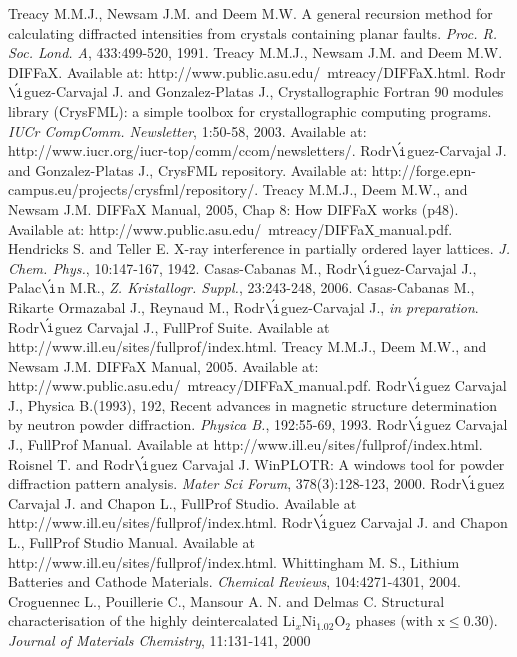 

\begin{thebibliography}{99}
 Treacy M.M.J., Newsam J.M. and Deem M.W. A general recursion method for calculating diffracted intensities from crystals containing planar faults. \textit{Proc. R. Soc. Lond. A}, 433:499-520, 1991. 
 Treacy M.M.J., Newsam J.M. and Deem M.W. DIFFaX. Available at: http://www.public.asu.edu/~mtreacy/DIFFaX.html.
 Rodr$\acute{\i}$guez-Carvajal J. and Gonzalez-Platas J., Crystallographic Fortran 90 modules library (CrysFML): a simple toolbox for crystallographic computing programs. \textit{IUCr CompComm. Newsletter}, 1:50-58, 2003. Available at: http://www.iucr.org/iucr-top/comm/ccom/newsletters/. 
 Rodr$\acute{\i}$guez-Carvajal J. and Gonzalez-Platas J., CrysFML repository. Available at: http://forge.epn-campus.eu/projects/crysfml/repository/.
 Treacy M.M.J., Deem M.W., and Newsam J.M. DIFFaX Manual, 2005, Chap 8: How DIFFaX works (p48). Available at: http://www.public.asu.edu/~mtreacy/DIFFaX$\_$manual.pdf.
 Hendricks S. and Teller E. X-ray interference in partially ordered layer lattices. \textit{J. Chem. Phys.}, 10:147-167, 1942.
 Casas-Cabanas M., Rodr$\acute{\i}$guez-Carvajal J., Palac$\acute{\i}$n M.R., \textit{Z. Kristallogr. Suppl.}, 23:243-248, 2006.
 Casas-Cabanas M., Rikarte Ormazabal J., Reynaud M., Rodr$\acute{\i}$guez-Carvajal J., \textit{in preparation}.
 Rodr$\acute{\i}$guez Carvajal J., FullProf Suite. Available at http://www.ill.eu/sites/fullprof/index.html.
 Treacy M.M.J., Deem M.W., and Newsam J.M. DIFFaX Manual, 2005. Available at: http://www.public.asu.edu/~mtreacy/DIFFaX$\_$manual.pdf.
 Rodr$\acute{\i}$guez Carvajal J., Physica B.(1993), 192, Recent advances in magnetic structure determination by neutron powder 
diffraction. \textit{Physica B.}, 192:55-69, 1993.
 Rodr$\acute{\i}$guez Carvajal J., FullProf Manual. Available at http://www.ill.eu/sites/fullprof/index.html.
 Roisnel T. and Rodr$\acute{\i}$guez Carvajal J. WinPLOTR: A windows tool for powder diffraction pattern analysis. \textit{Mater Sci Forum}, 378(3):128-123, 2000.
 Rodr$\acute{\i}$guez Carvajal J. and Chapon L., FullProf Studio. Available at http://www.ill.eu/sites/fullprof/index.html.
 Rodr$\acute{\i}$guez Carvajal J. and Chapon L., FullProf Studio Manual. Available at http://www.ill.eu/sites/fullprof/index.html.
 Whittingham M. S., Lithium Batteries and Cathode Materials. \textit{Chemical Reviews}, 104:4271-4301, 2004. 
 Croguennec L., Pouillerie C., Mansour A. N. and Delmas C. Structural characterisation of the highly deintercalated Li$_{x}$Ni$_{1.02}$O$_{2}$ phases (with x$\leq$0.30). \textit{Journal of Materials Chemistry}, 11:131-141, 2000
\end{thebibliography}
